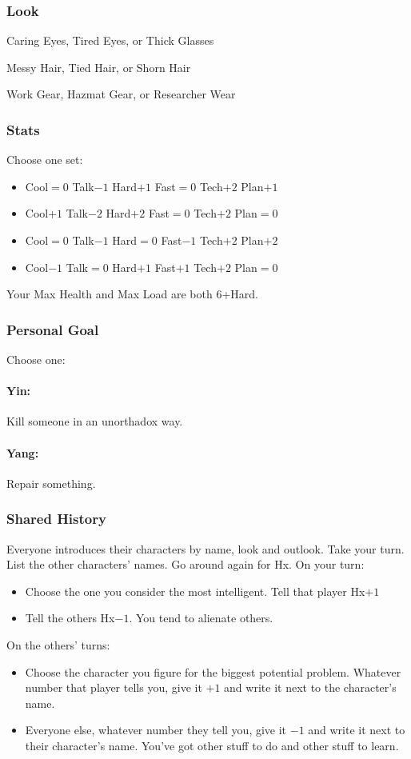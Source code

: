 \subsubsection{Look}

Caring Eyes, Tired Eyes, or Thick Glasses

Messy Hair, Tied Hair, or Shorn Hair

Work Gear, Hazmat Gear, or Researcher Wear

\subsubsection{Stats}
Choose one set:
\begin{itemize}
\setlength\itemsep{0em}
\item Cool${=}0$ Talk$-1$ Hard$+1$ Fast${=}0$ Tech$+2$ Plan$+1$
\item Cool$+1$ Talk$-2$ Hard$+2$ Fast${=}0$ Tech$+2$ Plan${=}0$
\item Cool${=}0$ Talk$-1$ Hard${=}0$ Fast$-1$ Tech$+2$ Plan$+2$
\item Cool$-1$ Talk${=}0$ Hard$+1$ Fast$+1$ Tech$+2$ Plan${=}0$
\end{itemize}

Your Max Health and Max Load are both 6+Hard.

\subsubsection{Personal Goal}
Choose one:
\paragraph{Yin:} Kill someone in an unorthadox way.
\paragraph{Yang:} Repair something.

\subsubsection{Shared History}
Everyone introduces their characters by name, look and outlook. Take
your turn. List the other characters' names. Go around again for
Hx. On your turn:
\begin{itemize} %
\item Choose the one you consider the most intelligent. Tell that player Hx$+1$
\item Tell the others Hx$-1$. You tend to alienate others.
\end{itemize}
On the others’ turns:
\begin{itemize} %
\item Choose the character you figure for the biggest potential
  problem. Whatever number that player tells you, give it $+1$ and write
  it next to the character’s name.
\item Everyone else, whatever number they tell you, give it $-1$ and
  write it next to their character’s name. You’ve got other stuff to
  do and other stuff to learn.
\end{itemize}

